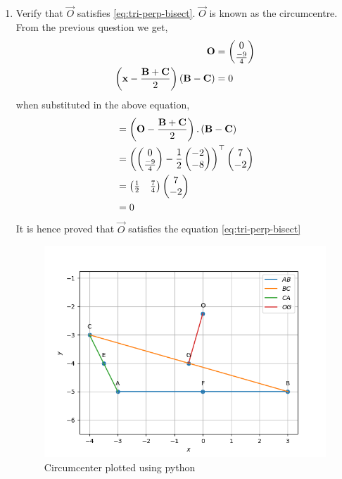 \documentclass[11pt]{book}
\begin{document}
\begin{enumerate}[label=\thesection.\arabic*.,ref=\thesection.\theenumi]
\item Verify that $\vec{O}$ satisfies
			\eqref{eq:tri-perp-bisect}.
$\vec{O}$ is known as the circumcentre.\\
 \solution
 From the previous question we get,
 \begin{align}
\mathbf{O}&=\begin{pmatrix}0\\ \frac{-9}{4}\end{pmatrix} \\
\left(\mathbf{x}-\frac{\mathbf{B}+\mathbf{C}}{2}\right)\left(\mathbf{B}-\mathbf{C}\right) &= 0
\end{align}
when substituted in the above equation,
\begin{align}
	&=\left(\mathbf{O}-\frac{\mathbf{B}+\mathbf{C}}{2}\right).\left(\mathbf{B}-\mathbf{C}\right)\\
	&=\left(\begin{pmatrix}0\\ \frac{-9}{4}\end{pmatrix}- \frac{1}{2}\begin{pmatrix}-2\\-8\end{pmatrix}\right)^{\top} \begin{pmatrix}7\\-2\end{pmatrix}\\
	&=\begin{pmatrix}\frac{1}{2}& \frac{7}{4}\end{pmatrix}\begin{pmatrix}7\\-2\end{pmatrix}\\
	&=0
\end{align}
It is hence proved that $\vec{O}$ satisfies the equation \eqref{eq:tri-perp-bisect}
\begin{figure}[H]
\centering
\includegraphics[width=\columnwidth]{figs/perp_bisect3.png}
\caption{Circumcenter plotted using python}
\label{fig:Circumcenter to BC}
\end{figure}


\end{enumerate}
\end{document}
